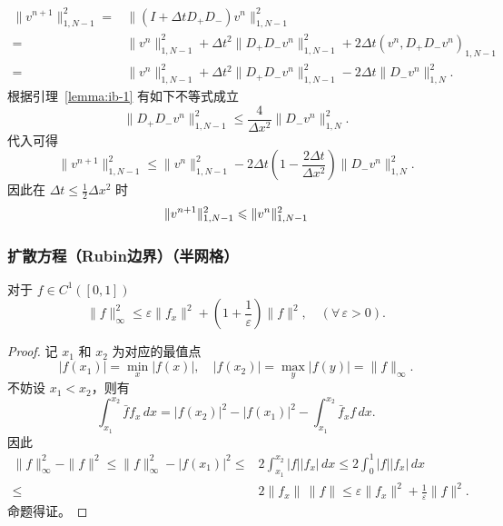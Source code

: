 \begin{solution*}
    \begin{align*}
        \| v^{n+1} \|_{1,N-1}^2
        ={} & \|(I + \Delta t D_+D_-) v^n\|_{1,N-1}^2                     \\
        ={} & \| v^n \|_{1,N-1}^2 + \Delta t^2 \| D_+ D_- v^n\|_{1,N-1}^2
        + 2 \Delta t \left( v^n, D_+ D_- v^n \right)_{1,N-1}
        \\
        ={} & \| v^n \|_{1,N-1}^2 + \Delta t^2 \| D_+ D_- v^n\|_{1,N-1}^2
        - 2 \Delta t \| D_- v^n\|_{1,N}^2.
    \end{align*}
    根据引理~\ref{lemma:ib-1} 有如下不等式成立
    \[
        \| D_+ D_- v^n\|_{1,N-1}^2 \le \frac{4}{\Delta x^2} \| D_- v^n \|_{1,N}^2.
    \]
    代入可得
    \[
        \| v^{n+1} \|_{1,N-1}^2 \le \| v^{n} \|_{1,N-1}^2
        - 2\Delta t \left( 1 - \frac{2\Delta t}{\Delta x^2} \right) \| D_- v^n \|_{1,N}^2.
    \]
    因此在 $\Delta t \le \frac12 \Delta x^2$ 时
    \[
        \| v^{n+1} \|_{1,N-1}^2 \le \| v^{n} \|_{1,N-1}^2 \qedhere
    \]
\end{solution*}

\subsubsection{扩散方程（Rubin边界）（半网格）}

\begin{lemma}\label{lemma:ib-2}
    对于 $f \in C^1([0,1])$
    \[
        \|f\|_{\infty}^2 \le \varepsilon \|f_x\|^2 + \left(1 + \frac{1}{\varepsilon}\right) \|f\|^2,\quad (\forall\,\varepsilon > 0).
    \]
\end{lemma}

\begin{proof}
    记 $x_1$ 和 $x_2$ 为对应的最值点
    \[
        |f(x_1)| = \min_x |f(x)|,\quad |f(x_2)| = \max_y |f(y)| = \|f\|_{\infty}.
    \]
    不妨设 $x_1 < x_2$，则有
    \[
        \int_{x_1}^{x_2} \bar{f} f_x\,dx = |f(x_2)|^2 - |f(x_1)|^2 - \int_{x_1}^{x_2} \bar{f}_x f\,dx.
    \]
    因此
    \begin{align*}
        \|f\|_{\infty}^2 - \|f\|^2 \le{}
        \|f\|_{\infty}^2 - |f(x_1)|^2 \le{} & 2 \int_{x_1}^{x_2} |f| |f_x|\,dx
        \le{} 2 \int_0^1 |f| |f_x|\,dx                                         \\
        \le{}                               & 2 \|f_x\|\, \|f\|
        \le \varepsilon \| f_x \|^2 + \frac{1}{\varepsilon} \|f\|^2.
    \end{align*}
    命题得证。
\end{proof}


